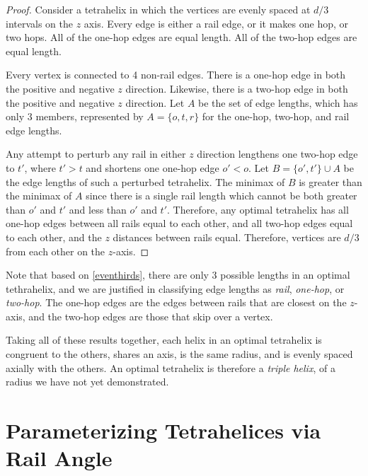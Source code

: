 \documentclass[twocolumn,10pt]{asme2ej}
\begin{document}
\begin{proof}
    Consider a tetrahelix in which the vertices are evenly spaced at
    $d/3$ intervals on the $z$ axis. Every edge is either a rail edge,
    or it makes one hop, or two hops. All of the one-hop
    edges are equal length.  All of the two-hop edges are equal
    length.

    Every vertex is connected to 4 non-rail edges. There is a one-hop edge
    in both the positive and negative $z$ direction. Likewise, there is a two-hop
    edge in both the positive and negative $z$ direction. Let $A$ be the set
    of edge lengths, which has only 3 members, represented by $A = \{o,t,r\}$ for
    the one-hop, two-hop, and rail edge lengths.

    Any attempt to perturb any rail in either $z$ direction lengthens one two-hop edge to $t'$, where $t' > t$
    and shortens one one-hop edge $o' < o$. Let $B = \{o',t' \} \cup A$ be the edge lengths of such a
    perturbed tetrahelix.
    The minimax of $B$ is greater than the minimax of $A$ since there is a single rail length which cannot be both greater
    than $o'$ and $t'$ and less than $o'$ and $t'$.
    Therefore, any optimal tetrahelix has all one-hop edges between all rails equal to each other, and
    all two-hop edges equal to each other, and the $z$ distances between rails equal. Therefore, vertices are
    $d/3$ from each other on the $z$-axis.
\end{proof}

 Note that based on \cref{eventhirds}, there are only 3 possible lengths in an optimal tethrahelix,
 and we are justified in classifying edge lengths as \emph{rail}, \emph{one-hop}, or
\emph{two-hop}. The one-hop edges are the edges between rails that are closest on the $z$-axis, and the two-hop edges are those that skip over a vertex.


Taking all of these results together, 
each helix in an optimal tetrahelix is congruent to the others, shares an axis, is the same radius, and is evenly spaced
axially with the others.
An optimal tetrahelix is therefore a \emph{triple helix}, of a radius we have not yet demonstrated.

\section{Parameterizing Tetrahelices via Rail Angle}
\label{sec:parameterizing}
\end{document}
